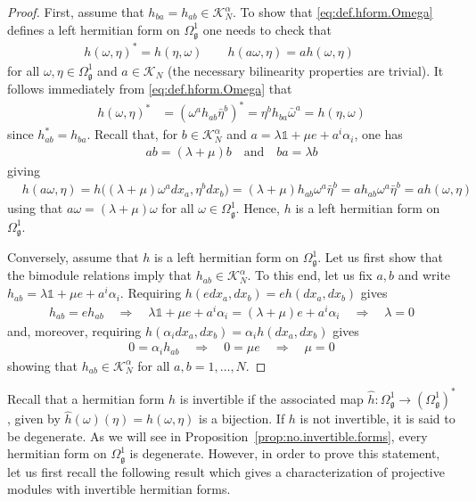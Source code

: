 \documentclass{amsart}
\newcommand{\paraa}[1]{\big(#1\big)}
\newcommand{\spacearound}[1]{\quad#1\quad}
\renewcommand{\implies}{\spacearound{\Rightarrow}}
\theoremstyle{definition}
\theoremstyle{remark}
\numberwithin{equation}{section}
\newcommand{\K}{\mathcal{K}}
\renewcommand{\mid}{\mathds{1}}
\newcommand{\KN}{\K_N}
\newcommand{\KaN}{\K^\alpha_N}
\newcommand{\qand}{\quad\text{and}\quad}
\newcommand{\g}{\mathfrak{g}}
\newcommand{\Omegaoneg}{\Omega^1_{\g}}
\newcommand{\hh}{\hat{h}}
\begin{document}
\begin{proof}
  First, assume that $h_{ba}=h_{ab}\in\KaN$. To show that
  \eqref{eq:def.hform.Omega} defines a left hermitian form on
  $\Omegaoneg$ one needs to check that
  \begin{align*}
    h(\omega,\eta)^\ast = h(\eta,\omega)\qquad
    h(a\omega,\eta) = ah(\omega,\eta)\qquad
  \end{align*}
  for all $\omega,\eta\in\Omegaoneg$ and $a\in\KN$ (the necessary
  bilinearity properties are trivial). It
  follows immediately from \eqref{eq:def.hform.Omega} that
  \begin{align*}
    h(\omega,\eta)^\ast
    &= (\omega^ah_{ab}\bar{\eta}^b)^\ast
      = \eta^bh_{ba}\bar{\omega}^a = h(\eta,\omega)
  \end{align*}
  since $h_{ab}^\ast=h_{ba}$.  Recall that, for $b\in\KaN$ and
  $a=\lambda\mid + \mu e + a^i\alpha_i$, one has
  \begin{align*}
    ab = (\lambda+\mu)b\qand
    ba = \lambda b
  \end{align*}
  giving
  \begin{align*}
    &h(a\omega,\eta)
      = h\paraa{(\lambda+\mu)\omega^adx_a,\eta^bdx_b}
      = (\lambda+\mu)h_{ab}\omega^a\bar{\eta}^b = ah_{ab}\omega^a\bar{\eta}^b
      = ah(\omega,\eta)
  \end{align*}
  using that $a\omega = (\lambda+\mu)\omega$ for all
  $\omega\in\Omegaoneg$. Hence, $h$ is a left hermitian form on
  $\Omegaoneg$.

  Conversely, assume that $h$ is a left hermitian form on
  $\Omegaoneg$. Let us first show that the bimodule relations imply
  that $h_{ab}\in\KaN$. To this end, let us fix $a,b$ and write
  $h_{ab}=\lambda\mid + \mu e + a^i\alpha_i$. Requiring
  $h(edx_a,dx_b)=eh(dx_a,dx_b)$ gives
  \begin{align*}
    h_{ab} = eh_{ab}\implies
    \lambda\mid+\mu e + a^i\alpha_i = (\lambda+\mu)e + a^i\alpha_i\implies\lambda = 0
  \end{align*}
  and, moreover, requiring $h(\alpha_idx_a,dx_b)=\alpha_ih(dx_a,dx_b)$ gives
  \begin{align*}
    0=\alpha_ih_{ab}\implies 0 = \mu e\implies \mu=0
  \end{align*}
  showing that $h_{ab}\in\KaN$ for all $a,b=1,\ldots,N$.
\end{proof}

\noindent
Recall that a hermitian form $h$ is invertible if the
associated map $\hh:\Omegaoneg\to(\Omegaoneg)^\ast$, given by
$\hh(\omega)(\eta) = h(\omega,\eta)$ is a bijection. If $h$ is not
invertible, it is said to be degenerate. As we will see in
Proposition~\ref{prop:no.invertible.forms}, every hermitian form on
$\Omegaoneg$ is degenerate. However, in order to prove this statement,
let us first recall the following result which gives a
characterization of projective modules with invertible hermitian
forms.
\end{document}
